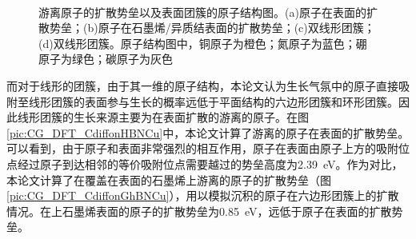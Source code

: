     \begin{figure}[htb]
        \\[-1ex]
        \caption{游离原子的扩散势垒以及表面团簇的原子结构图。(a)原子在表面的扩散势垒；(b)原子在石墨烯/异质结表面的扩散势垒；(c)双线形团簇；(d)双线形团簇。原子结构图中，铜原子为橙色；氮原子为蓝色；硼原子为绿色；碳原子为灰色}
        \label{}
    \end{figure}

    而对于线形的团簇，由于其一维的原子结构，本论文认为生长气氛中的原子直接吸附至线形团簇的表面参与生长的概率远低于平面结构的六边形团簇和环形团簇。因此线形团簇的生长来源主要为在表面扩散的游离的原子。在图\ref{pic:CG_DFT_CdiffonHBNCu}中，本论文计算了游离的原子在表面的扩散势垒。可以看到，由于原子和表面非常强烈的相互作用，原子在表面由原子上方的吸附位点经过原子到达相邻的等价吸附位点需要越过的势垒高度为\SI{2.39}{\electronvolt}。作为对比，本论文计算了在覆盖在表面的石墨烯上游离的原子的扩散势垒（图\ref{pic:CG_DFT_CdiffonGhBNCu}），用以模拟沉积的原子在六边形团簇上的扩散情况。在上石墨烯表面的原子的扩散势垒为\SI{0.85}{\electronvolt}，远低于原子在表面的扩散势垒。

